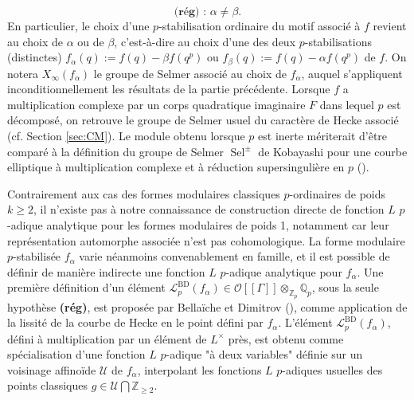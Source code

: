 \documentclass[12pt]{amsart}
\newcommand\bZ{\mathbb{Z}}
\newcommand\Zp{{\mathbb{Z}_{p}}}
\newcommand\Qp{\mathbb{Q}_{p}}
\newcommand\cL{\mathcal{L}}
\newcommand\cO{\mathcal{O}}
\newcommand\cU{\mathcal{U}}
\DeclareMathOperator{\Sel}{Sel}
\theoremstyle{defstyle}
\theoremstyle{thmstyle}
\begin{document}
$$ \textbf{(rég) : } \alpha \neq \beta. $$ 
En particulier, le choix d'une $p$-stabilisation ordinaire du motif associé à $f$ revient au choix de $\alpha$ ou de $\beta$, c'est-à-dire au choix d'une des deux $p$-stabilisations (distinctes) $f_\alpha(q):=f(q)-\beta f(q^p)$ ou $f_\beta(q):=f(q)-\alpha f(q^p)$ de $f$. On notera $X_\infty(f_\alpha)$ le groupe de Selmer associé au choix de $f_\alpha$, auquel s'appliquent inconditionnellement les résultats de la partie précédente. Lorsque $f$ a multiplication complexe par un corps quadratique imaginaire $F$ dans lequel $p$ est décomposé, on retrouve le groupe de Selmer usuel du caractère de Hecke associé (cf. Section \ref{sec:CM}). Le module obtenu lorsque $p$ est inerte mériterait d'être comparé à la définition du groupe de Selmer $\Sel^\pm$ de Kobayashi pour une courbe elliptique à multiplication complexe et à réduction supersingulière en $p$ (\cite{kobayashi,rubinpollack}).

Contrairement aux cas des formes modulaires classiques $p$-ordinaires de poids $k\geq 2$, il n'existe pas à notre connaissance de construction directe de fonction $L$ $p$-adique analytique pour les formes modulaires de poids 1, notamment car leur représentation automorphe associée n'est pas cohomologique. La forme modulaire $p$-stabilisée $f_\alpha$ varie néanmoins convenablement en famille, et il est possible de définir de manière indirecte une fonction $L$ $p$-adique analytique pour $f_\alpha$. Une première définition d'un élément  $\cL^\textrm{BD}_p(f_\alpha) \in \cO[[\Gamma]] \otimes_\Zp \Qp$, sous la seule hypothèse \textbf{(rég)}, est proposée par Bellaïche et Dimitrov (\cite[Corollary 1.3]{bellaiche2016eigencurve}), comme application de la lissité de la courbe de Hecke en le point défini par $f_\alpha$. L'élément $\cL^\textrm{BD}_p(f_\alpha)$, défini à multiplication par un élément de $L^\times$ près, est obtenu comme spécialisation d'une fonction $L$ $p$-adique "à deux variables" définie sur un voisinage affinoïde $\cU$ de $f_\alpha$, interpolant les fonctions $L$ $p$-adiques usuelles des points classiques $g\in \cU\bigcap \bZ_{\geq 2}$. 
\end{document}
